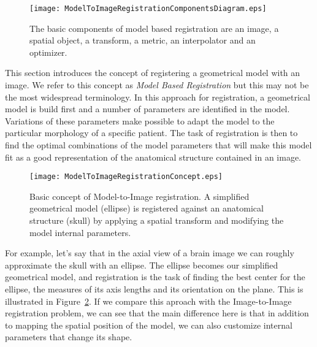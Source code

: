 %
%
%
%
%
%

\begin{figure}
\center
\texttt{[image: ModelToImageRegistrationComponentsDiagram.eps]}
\caption[Model to Image Registration Framework Components]{The basic components
  of model based registration are an image, a spatial object, a transform, a
    metric, an interpolator and an optimizer.}
\label{fig:ModelToImageRegistrationComponentsDiagram}
\end{figure}


This section introduces the concept of registering a geometrical model with an
image. We refer to this concept as \emph{Model Based Registration} but this may
not be the most widespread terminology. In this approach for registration, a
geometrical model is build first and a number of parameters are identified in
the model. Variations of these parameters make possible to adapt the model to
the particular morphology of a specific patient. The task of registration is
then to find the optimal combinations of the model parameters that will make
this model fit as a good representation of the anatomical structure contained
in an image. 


\begin{figure}
\center
\texttt{[image: ModelToImageRegistrationConcept.eps]}
\caption[Model to Image Registration Framework Concept]{Basic concept of
Model-to-Image registration.  A simplified geometrical model (ellipse) is
registered against an anatomical structure (skull)  by applying a spatial
transform and modifying the model internal parameters.}
\label{fig:ModelToImageRegistrationConcept}
\end{figure}


For example, let's say that in the axial view of a brain image we can roughly
approximate the skull with an ellipse. The ellipse becomes our simplified
geometrical model, and registration is the task of finding the best center for
the ellipse, the measures of its axis lengths and its orientation on the plane.
This is illustrated in Figure~\ref{fig:ModelToImageRegistrationConcept}.  If we
compare this aproach with the Image-to-Image registration problem, we can see
that the main difference here is that in addition to mapping the spatial
position of the model, we can also customize internal parameters that change
its shape.

